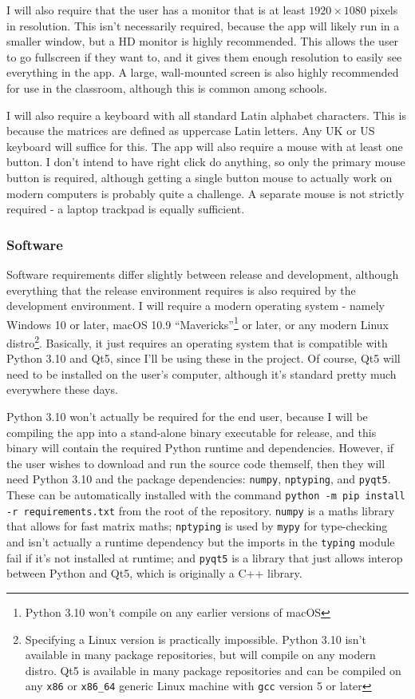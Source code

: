 \documentclass[../main.tex]{subfiles}
\begin{document}
I will also require that the user has a monitor that is at least $1920 \times 1080$ pixels in resolution. This isn't necessarily required, because the app will likely run in a smaller window, but a HD monitor is highly recommended. This allows the user to go fullscreen if they want to, and it gives them enough resolution to easily see everything in the app. A large, wall-mounted screen is also highly recommended for use in the classroom, although this is common among schools.

I will also require a keyboard with all standard Latin alphabet characters. This is because the matrices are defined as uppercase Latin letters. Any UK or US keyboard will suffice for this. The app will also require a mouse with at least one button. I don't intend to have right click do anything, so only the primary mouse button is required, although getting a single button mouse to actually work on modern computers is probably quite a challenge. A separate mouse is not strictly required - a laptop trackpad is equally sufficient.

\subsubsection{Software\label{subsubsection:software}}

Software requirements differ slightly between release and development, although everything that the release environment requires is also required by the development environment. I will require a modern operating system - namely Windows 10 or later, macOS 10.9 \enquote{Mavericks}\footnote{Python 3.10 won't compile on any earlier versions of macOS\cite{python-3-10-downloads-page}} or later, or any modern Linux distro\footnote{Specifying a Linux version is practically impossible. Python 3.10 isn't available in many package repositories, but will compile on any modern distro. Qt5 is available in many package repositories and can be compiled on any \texttt{x86} or \texttt{x86\_64} generic Linux machine with \texttt{gcc} version 5 or later\cite{qt5-linux-build-dependencies}}. Basically, it just requires an operating system that is compatible with Python 3.10 and Qt5, since I'll be using these in the project. Of course, Qt5 will need to be installed on the user's computer, although it's standard pretty much everywhere these days.

Python 3.10 won't actually be required for the end user, because I will be compiling the app into a stand-alone binary executable for release, and this binary will contain the required Python runtime and dependencies. However, if the user wishes to download and run the source code themself, then they will need Python 3.10 and the package dependencies: \texttt{numpy}, \texttt{nptyping}, and \texttt{pyqt5}. These can be automatically installed with the command \texttt{python -m pip install -r requirements.txt} from the root of the repository. \texttt{numpy} is a maths library that allows for fast matrix maths; \texttt{nptyping} is used by \texttt{mypy} for type-checking and isn't actually a runtime dependency but the imports in the \texttt{typing} module fail if it's not installed at runtime; and \texttt{pyqt5} is a library that just allows interop between Python and Qt5, which is originally a C++ library.
\end{document}
